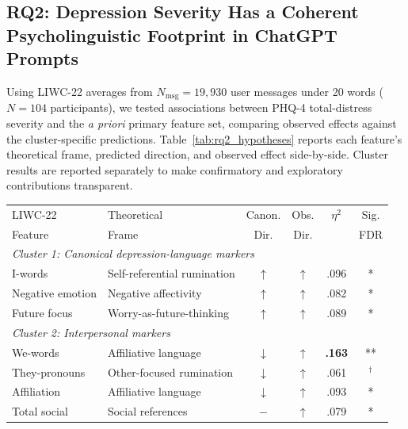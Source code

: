 \documentclass[letterpaper]{article}
\begin{document}
\subsection{RQ2: Depression Severity Has a Coherent Psycholinguistic Footprint in ChatGPT Prompts}

Using LIWC-22 averages from $N_{\mathrm{msg}}=19{,}930$ user messages under 20 words ($N=104$ participants), we tested associations between PHQ-4 total-distress severity and the \emph{a priori} primary feature set, comparing observed effects against the cluster-specific predictions. Table~\ref{tab:rq2_hypotheses} reports each feature's theoretical frame, predicted direction, and observed effect side-by-side. Cluster results are reported separately to make confirmatory and exploratory contributions transparent.

\begin{table}[t]
\small
\centering
\setlength{\tabcolsep}{4pt}
\begin{tabular}{p{1.9cm}p{2.5cm}cccc}
\toprule
LIWC-22  & Theoretical & Canon. & Obs. & $\eta^2$ & Sig. \\
Feature  & Frame       & Dir.   & Dir. &          & FDR  \\
\midrule
\multicolumn{6}{l}{\textit{Cluster 1: Canonical depression-language markers}} \\
I-words           & Self-referential rumination       & $\uparrow$ & $\uparrow$ & .096 & * \\
Negative emotion  & Negative affectivity              & $\uparrow$ & $\uparrow$ & .082 & * \\
Future focus      & Worry-as-future-thinking          & $\uparrow$ & $\uparrow$ & .089 & * \\
\midrule
\multicolumn{6}{l}{\textit{Cluster 2: Interpersonal markers}} \\
We-words          & Affiliative language              & $\downarrow$   & $\uparrow$ & \textbf{.163} & ** \\
They-pronouns     & Other-focused rumination          & $\downarrow$ & $\uparrow$ & .061 & $^{\dagger}$ \\
Affiliation       & Affiliative language              & $\downarrow$   & $\uparrow$ & .093 & * \\
Total social      & Social references                 & $-$ & $\uparrow$ & .079 & * \\
\bottomrule
\end{tabular}

\end{table}
\end{document}
